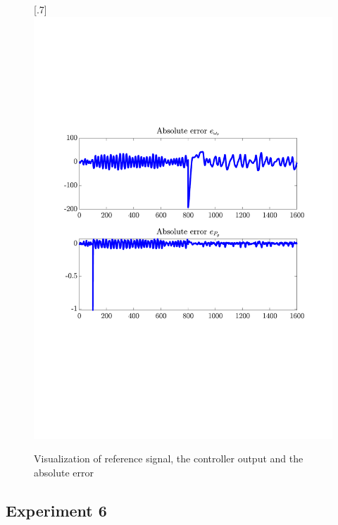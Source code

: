 \begin{figure}[H]
[.7\textwidth]{\includegraphics[width=1\linewidth, scale=1, trim=55 230 55 120,clip]{fig/Open_loop/exp_5_error.pdf}}
    \caption{Visualization of reference signal, the controller output and the absolute error}
    \label{fig:app:cl_results:exp5}
\end{figure}

\subsection{Experiment 6}

